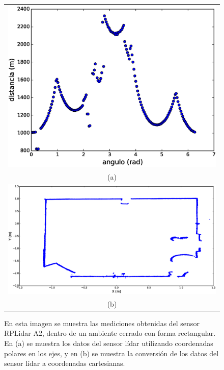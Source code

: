 \begin{figure}%
	\centering
	\begin{tabular}{c}
		\multicolumn{1}{c}{\includegraphics[width=.65\textwidth]{images/polarLidar.eps}}\\
      	\multicolumn{1}{c}{(a)}\\
      	\multicolumn{1}{c}{\includegraphics[width=1.\textwidth]{images/2dLidar.eps}}\\
      	\multicolumn{1}{c}{(b)}
	\end{tabular}
	\captionsetup{font=footnotesize}
    \caption{\label{f:lidarPlot}En esta imagen se muestra las mediciones obtenidas del sensor 
    RPLidar A2, dentro de un ambiente cerrado con forma rectangular. En (a) se muestra los 
    datos del sensor lídar utilizando coordenadas polares en los ejes, y en (b) se muestra 
    la conversión de los datos del sensor lídar a coordenadas cartesianas.}
\end{figure}

